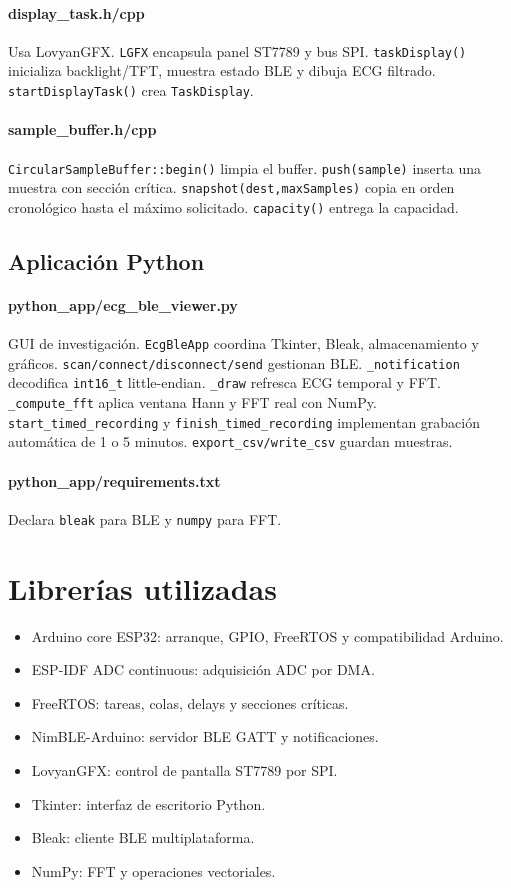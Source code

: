 \documentclass[11pt]{article}
\begin{document}
\paragraph{display\_task.h/cpp} Usa LovyanGFX. \texttt{LGFX} encapsula panel ST7789 y bus SPI. \texttt{taskDisplay()} inicializa backlight/TFT, muestra estado BLE y dibuja ECG filtrado. \texttt{startDisplayTask()} crea \texttt{TaskDisplay}.
\paragraph{sample\_buffer.h/cpp} \texttt{CircularSampleBuffer::begin()} limpia el buffer. \texttt{push(sample)} inserta una muestra con sección crítica. \texttt{snapshot(dest,maxSamples)} copia en orden cronológico hasta el máximo solicitado. \texttt{capacity()} entrega la capacidad.

\subsection{Aplicación Python}
\paragraph{python\_app/ecg\_ble\_viewer.py} GUI de investigación. \texttt{EcgBleApp} coordina Tkinter, Bleak, almacenamiento y gráficos. \texttt{scan/connect/disconnect/send} gestionan BLE. \texttt{\_notification} decodifica \texttt{int16\_t} little-endian. \texttt{\_draw} refresca ECG temporal y FFT. \texttt{\_compute\_fft} aplica ventana Hann y FFT real con NumPy. \texttt{start\_timed\_recording} y \texttt{finish\_timed\_recording} implementan grabación automática de 1 o 5 minutos. \texttt{export\_csv/write\_csv} guardan muestras.
\paragraph{python\_app/requirements.txt} Declara \texttt{bleak} para BLE y \texttt{numpy} para FFT.

\section{Librerías utilizadas}
\begin{itemize}
\item Arduino core ESP32: arranque, GPIO, FreeRTOS y compatibilidad Arduino.
\item ESP-IDF ADC continuous: adquisición ADC por DMA.
\item FreeRTOS: tareas, colas, delays y secciones críticas.
\item NimBLE-Arduino: servidor BLE GATT y notificaciones.
\item LovyanGFX: control de pantalla ST7789 por SPI.
\item Tkinter: interfaz de escritorio Python.
\item Bleak: cliente BLE multiplataforma.
\item NumPy: FFT y operaciones vectoriales.
\end{itemize}
\end{document}
